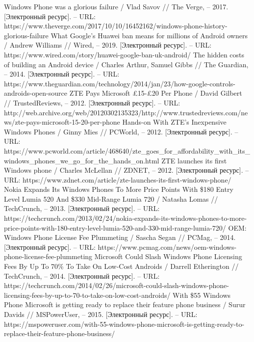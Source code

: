 \documentclass{article}
\begin{document}
\begin{thebibliography}{2}
 Windows Phone was a glorious failure / Vlad Savov // The Verge, – 2017. [Электронный ресурс]. – URL: https://www.theverge.com/2017/10/10/16452162/windows-phone-history-glorious-failure
 What Google's Huawei ban means for millions of Android owners / Andrew Williams // Wired, – 2019. [Электронный ресурс]. – URL: https://www.wired.com/story/huawei-google-ban-uk-android/
 The hidden costs of building an Android device / Charles Arthur, Samuel Gibbs // The Guardian, – 2014. [Электронный ресурс]. – URL: https://www.theguardian.com/technology/2014/jan/23/how-google-controls-androids-open-source
 ZTE Pays Microsoft £15-£20 Per Phone / David Gilbert // TrustedReviews, – 2012. [Электронный ресурс]. – URL: http://web.archive.org/web/20120302135323/http://www.trustedreviews.com/news/zte-pays-microsoft-15-20-per-phone
 Hands-on With ZTE’s Inexpensive Windows Phones / Ginny Mies // PCWorld, – 2012. [Электронный ресурс]. – URL: https://www.pcworld.com/article/468640/zte\_goes\_for\_affordability\_with\_its\_windows\_phones\_we\_go\_for\_the\_hands\_on.html
 ZTE launches its first Windows phone / Charles McLellan // ZDNET, – 2012. [Электронный ресурс]. – URL: https://www.zdnet.com/article/zte-launches-its-first-windows-phone/
 Nokia Expands Its Windows Phones To More Price Points With \$180 Entry Level Lumia 520 And \$330 Mid-Range Lumia 720 / Natasha Lomas // TechCrunch, – 2013. [Электронный ресурс]. – URL: https://techcrunch.com/2013/02/24/nokia-expands-its-windows-phones-to-more-price-points-with-180-entry-level-lumia-520-and-330-mid-range-lumia-720/
 OEM: Windows Phone License Fee Plummeting / Sascha Segan // PCMag, – 2014. [Электронный ресурс]. – URL: https://www.pcmag.com/news/oem-windows-phone-license-fee-plummeting
 Microsoft Could Slash Windows Phone Licensing Fees By Up To 70\% To Take On Low-Cost Androids / Darrell Etherington // TechCrunch, – 2014. [Электронный ресурс]. – URL: https://techcrunch.com/2014/02/26/microsoft-could-slash-windows-phone-licensing-fees-by-up-to-70-to-take-on-low-cost-androids/
 With \$55 Windows Phone Microsoft is getting ready to replace their feature phone business / Surur Davids // MSPowerUser, – 2015. [Электронный ресурс]. – URL: https://mspoweruser.com/with-55-windows-phone-microsoft-is-getting-ready-to-replace-their-feature-phone-business/

\end{thebibliography}
\end{document}
